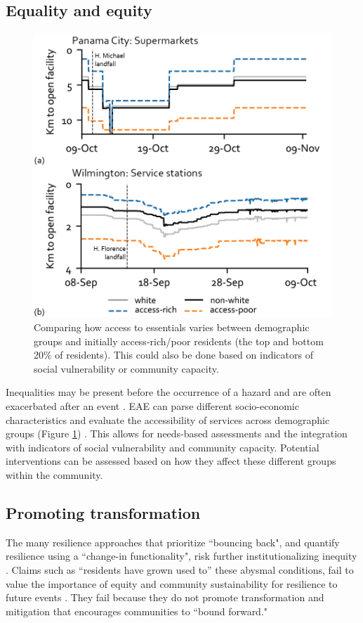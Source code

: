 \documentclass[onecolumn,doublespacing]{risa}
\let \cite \parencite
\begin{document}
\subsection{Equality and equity}
\begin{figure}
    \centering
    \includegraphics[width=\linewidth]{report/fig/equality.png}
    \caption{Comparing how access to essentials varies between demographic groups and initially access-rich/poor residents (the top and bottom 20\% of residents). This could also be done based on indicators of social vulnerability or community capacity.}
    \label{fig:equality}
\end{figure}
Inequalities may be present before the occurrence of a hazard and are often exacerbated after an event \cite{Gardoni2018-xu}.
EAE can parse different socio-economic characteristics and evaluate the accessibility of services across demographic groups (Figure \ref{fig:equality}) \cite{Williams_undated-sy}.
This allows for needs-based assessments and the integration with indicators of social vulnerability and community capacity.
Potential interventions can be assessed based on how they affect these different groups within the community.

\subsection{Promoting transformation}
The many resilience approaches that prioritize ``bouncing back", and quantify resilience using a ``change-in functionality", risk further institutionalizing inequity \cite{Normandin2019-hp, I_Sudmeier-Rieux2014-lc, MacKinnon2013-nx}.
Claims such as ``residents have grown used to” these abysmal conditions, fail to value the importance of equity and community sustainability for resilience to future events \cite{Dempsey2011-og, Pantelic1991-qu}.
They fail because they do not promote transformation and mitigation that encourages communities to ``bound forward."
\end{document}
